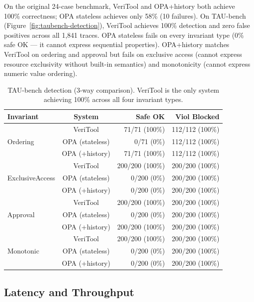 \documentclass[10pt,twocolumn]{article}
\begin{document}
On the original 24-case benchmark, VeriTool and OPA+history both achieve
100\% correctness; OPA stateless achieves only 58\% (10 failures).
On TAU-bench (Figure~\ref{fig:taubench-detection}), VeriTool achieves
100\% detection and zero false positives across all 1,841 traces.
OPA stateless fails on every invariant type (0\% safe OK --- it cannot
express sequential properties). OPA+history matches VeriTool on
ordering and approval but fails on exclusive access (cannot express
resource exclusivity without built-in semantics) and monotonicity
(cannot express numeric value ordering).

\begin{table}[t]
\centering
\caption{TAU-bench detection (3-way comparison). VeriTool is the only
  system achieving 100\% across all four invariant types.}
\label{tab:taubench-detection}
\begin{tabular}{lcrr}
\toprule
Invariant & System & Safe OK & Viol Blocked \\
\midrule
\multirow{3}{*}{Ordering}
 & VeriTool & 71/71 (100\%) & 112/112 (100\%) \\
 & OPA (stateless) & 0/71 (0\%) & 112/112 (100\%) \\
 & OPA (+history) & 71/71 (100\%) & 112/112 (100\%) \\
\midrule
\multirow{3}{*}{ExclusiveAccess}
 & VeriTool & 200/200 (100\%) & 200/200 (100\%) \\
 & OPA (stateless) & 0/200 (0\%) & 200/200 (100\%) \\
 & OPA (+history) & 0/200 (0\%) & 200/200 (100\%) \\
\midrule
\multirow{3}{*}{Approval}
 & VeriTool & 200/200 (100\%) & 200/200 (100\%) \\
 & OPA (stateless) & 0/200 (0\%) & 200/200 (100\%) \\
 & OPA (+history) & 200/200 (100\%) & 200/200 (100\%) \\
\midrule
\multirow{3}{*}{Monotonic}
 & VeriTool & 200/200 (100\%) & 200/200 (100\%) \\
 & OPA (stateless) & 0/200 (0\%) & 200/200 (100\%) \\
 & OPA (+history) & 0/200 (0\%) & 200/200 (100\%) \\
\bottomrule
\end{tabular}
\end{table}

\subsection{Latency and Throughput}
\end{document}
